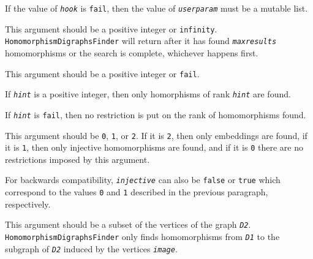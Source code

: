 \documentclass[a4paper,11pt]{report}
\begin{document}
{{{\begin{description}
 If the value of \mbox{\texttt{\mdseries\slshape hook}} is \texttt{fail}, then the value of \mbox{\texttt{\mdseries\slshape user{\textunderscore}param}} must be a mutable list. 
\item[{\mbox{\texttt{\mdseries\slshape max{\textunderscore}results}}}]  This argument should be a positive integer or \texttt{infinity}. \texttt{HomomorphismDigraphsFinder} will return after it has found \mbox{\texttt{\mdseries\slshape max{\textunderscore}results}} homomorphisms or the search is complete, whichever happens first. 
\item[{\mbox{\texttt{\mdseries\slshape hint}}}]  This argument should be a positive integer or \texttt{fail}. 

 If \mbox{\texttt{\mdseries\slshape hint}} is a positive integer, then only homorphisms of rank \mbox{\texttt{\mdseries\slshape hint}} are found.

 If \mbox{\texttt{\mdseries\slshape hint}} is \texttt{fail}, then no restriction is put on the rank of homomorphisms found. 
\item[{\mbox{\texttt{\mdseries\slshape injective}}}]  This argument should be \texttt{0}, \texttt{1}, or \texttt{2}. If it is \texttt{2}, then only embeddings are found, if it is \texttt{1}, then only injective homomorphisms are found, and if it is \texttt{0} there are no restrictions imposed by this argument. 

 For backwards compatibility, \mbox{\texttt{\mdseries\slshape injective}} can also be \texttt{false} or \texttt{true} which correspond to the values \texttt{0} and \texttt{1} described in the previous paragraph, respectively. 
\item[{\mbox{\texttt{\mdseries\slshape image}}}]  This argument should be a subset of the vertices of the graph \mbox{\texttt{\mdseries\slshape D2}}. \texttt{HomomorphismDigraphsFinder} only finds homomorphisms from \mbox{\texttt{\mdseries\slshape D1}} to the subgraph of \mbox{\texttt{\mdseries\slshape D2}} induced by the vertices \mbox{\texttt{\mdseries\slshape image}}.


\end{description}}}}
\end{document}
